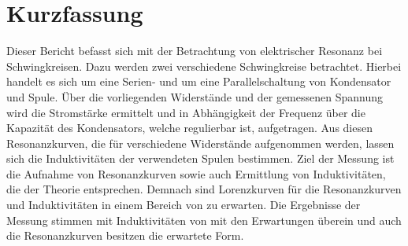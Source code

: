 
\section{Kurzfassung}

Dieser Bericht befasst sich mit der Betrachtung von elektrischer Resonanz bei Schwingkreisen.
Dazu werden zwei verschiedene Schwingkreise betrachtet.
Hierbei handelt es sich um eine Serien- und um eine Parallelschaltung von Kondensator und Spule.
Über die vorliegenden Widerstände und der gemessenen Spannung wird die Stromstärke ermittelt und in Abhängigkeit der Frequenz über die Kapazität des Kondensators, welche regulierbar ist, aufgetragen.
Aus diesen Resonanzkurven, die für verschiedene Widerstände aufgenommen werden, lassen sich die Induktivitäten der verwendeten Spulen bestimmen.
Ziel der Messung ist die Aufnahme von Resonanzkurven sowie auch Ermittlung von Induktivitäten, die der Theorie entsprechen.
Demnach sind Lorenzkurven für die Resonanzkurven und Induktivitäten in einem Bereich von %
	zu erwarten.
Die Ergebnisse der Messung stimmen mit Induktivitäten von %
	mit den Erwartungen überein und auch die Resonanzkurven besitzen die erwartete Form.